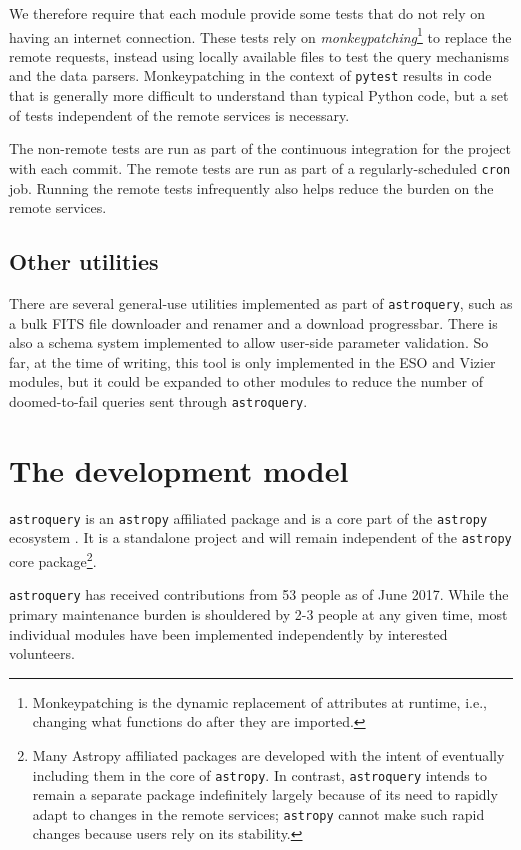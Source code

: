 \documentclass[twocolumn]{aastex61}
\newcommand{\package}[1]{\texttt{#1}\xspace}
\newcommand{\astroquery}{\package{astroquery}}
\newcommand{\astropy}{Astropy\xspace}
\newcommand{\astropypkg}{\package{astropy}}
\begin{document}
We therefore require that each module provide some tests that do not rely on
having an internet connection.  These tests rely on
\emph{monkeypatching}\footnote{Monkeypatching is the dynamic replacement of
attributes at runtime, i.e., changing what functions do after they are
imported.} to
replace the remote requests, instead using locally available files to test the
query mechanisms and the data parsers.  Monkeypatching in the context of
\package{pytest} results in code that is generally more difficult to understand
than typical Python code, but a set of tests independent of the remote services
is necessary.

The non-remote tests are run as part of the continuous integration for the
project with each commit.  The remote tests are run as part of a
regularly-scheduled \texttt{cron} job.  Running the remote tests infrequently
also helps reduce the burden on the remote services.

\subsection{Other utilities}
There are several general-use utilities implemented as part of \astroquery, such
as a bulk FITS file downloader and renamer and a download progressbar.  There
is also a schema system implemented to allow user-side parameter validation.
So far, at the time of writing, this tool is only implemented in the ESO and
Vizier modules, but it could be expanded to other modules to reduce the number
of doomed-to-fail queries sent through \astroquery.

\section{The development model}
\label{sec:development}
\astroquery is an \astropypkg affiliated package and is a core part of the
\astropypkg ecosystem \citep{Astropy-Collaboration2013a}.  It is a standalone
project and will remain independent of the \astropypkg core
package\footnote{Many \astropy affiliated packages are developed with the
intent of eventually including them in the core of \astropypkg.  In contrast,
\astroquery intends to remain a separate package indefinitely largely because
of its need to rapidly adapt to changes in the remote services; \astropypkg
cannot make such rapid changes because users rely on its stability.}.

\astroquery has received contributions from 53 people as of June 2017.
While the primary maintenance burden is shouldered by 2-3 people at any given time,
most individual modules have been implemented independently by interested volunteers.
\end{document}

